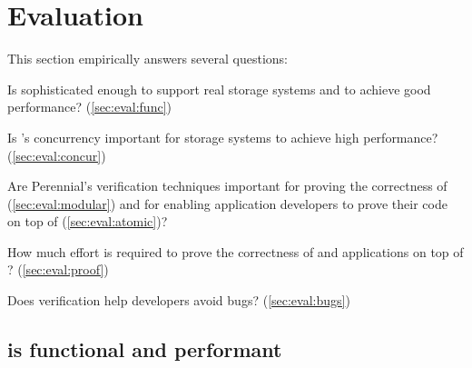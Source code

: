 \section{Evaluation}
\label{s:eval}

This section empirically answers several questions:

\begin{CompactItemize}

\item Is \txn sophisticated enough to support real storage systems
  and to achieve good performance?  (\autoref{sec:eval:func})


\item Is \txn's concurrency important for storage systems to achieve
  high performance?  (\autoref{sec:eval:concur})


\item Are Perennial's verification techniques important for proving the
  correctness of \txn (\autoref{sec:eval:modular}) and for enabling
  application developers to prove their code on top of \txn
  (\autoref{sec:eval:atomic})?


\item How much effort is required to prove the correctness of
  \txn and applications on top of \txn?  (\autoref{sec:eval:proof})


\item Does verification help developers avoid bugs?
  (\autoref{sec:eval:bugs})



\end{CompactItemize}


\subsection{\txn is functional and performant}
\label{sec:eval:func}

